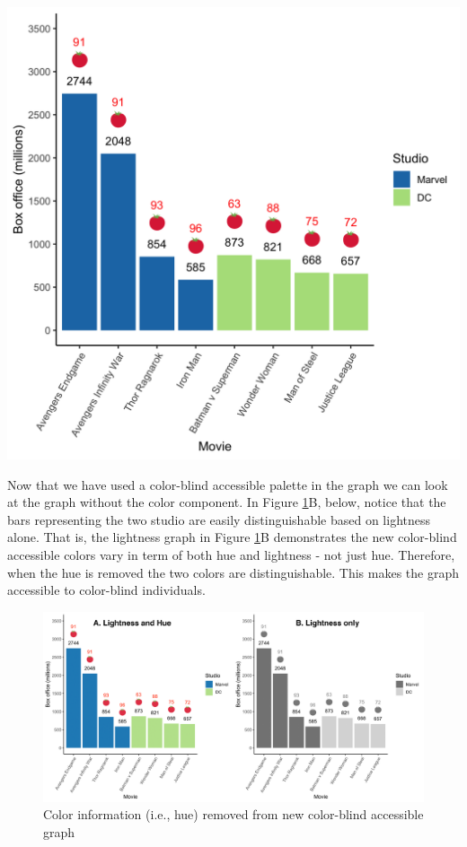 \documentclass[
]{krantz}
\begin{document}
\includegraphics[width=0.85\linewidth]{ch_graphing/images/emoji_graph5}

Now that we have used a color-blind accessible palette in the graph we can look at the graph without the color component. In Figure \ref{fig:colorcomparison2}B, below, notice that the bars representing the two studio are easily distinguishable based on lightness alone. That is, the lightness graph in Figure \ref{fig:colorcomparison2}B demonstrates the new color-blind accessible colors vary in term of both hue and lightness - not just hue. Therefore, when the hue is removed the two colors are distinguishable. This makes the graph accessible to color-blind individuals.

\begin{figure}
\includegraphics[width=0.85\linewidth]{ch_graphing/images/nocolorcomparison2} \caption{Color information (i.e., hue) removed from new color-blind accessible graph}\label{fig:colorcomparison2}
\end{figure}
\end{document}
